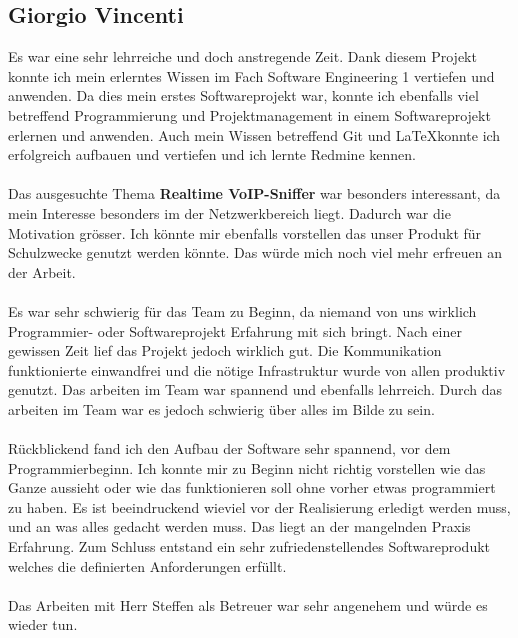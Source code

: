 \documentclass[a4,12pt]{scrartcl}
\begin{document}
\subsection{Giorgio Vincenti}
Es war eine sehr lehrreiche und doch anstregende Zeit. Dank diesem Projekt konnte ich mein erlerntes Wissen im Fach Software Engineering 1 vertiefen und anwenden. Da dies mein erstes Softwareprojekt war, konnte ich ebenfalls viel betreffend Programmierung und Projektmanagement in einem Softwareprojekt erlernen und anwenden. Auch mein Wissen betreffend Git und \LaTeX  konnte ich erfolgreich aufbauen und vertiefen und ich lernte Redmine kennen.\\
\\
Das ausgesuchte Thema \textbf{Realtime VoIP-Sniffer} war besonders interessant, da mein Interesse besonders im der Netzwerkbereich liegt. Dadurch war die Motivation grösser. Ich könnte mir ebenfalls vorstellen das unser Produkt für Schulzwecke genutzt werden könnte. Das würde mich noch viel mehr erfreuen an der Arbeit. \\
\\
Es war sehr schwierig für das Team zu Beginn, da niemand von uns wirklich Programmier- oder Softwareprojekt Erfahrung mit sich bringt. Nach einer gewissen Zeit lief das Projekt jedoch wirklich gut. Die Kommunikation funktionierte einwandfrei und die nötige Infrastruktur wurde von allen produktiv genutzt. Das arbeiten im Team war spannend und ebenfalls lehrreich. Durch das arbeiten im Team war es jedoch schwierig über alles im Bilde zu sein.\\
\\
Rückblickend fand ich den Aufbau der Software sehr spannend, vor dem Programmierbeginn. Ich konnte mir zu Beginn nicht richtig vorstellen wie das Ganze aussieht oder wie das funktionieren soll ohne vorher etwas programmiert zu haben. Es ist beeindruckend wieviel vor der Realisierung erledigt werden muss, und an was alles gedacht werden muss. Das liegt an der mangelnden Praxis Erfahrung. Zum Schluss entstand ein sehr zufriedenstellendes Softwareprodukt welches die definierten Anforderungen erfüllt.\\
\\
Das Arbeiten mit Herr Steffen als Betreuer war sehr angenehem und würde es wieder tun. 
\end{document}
